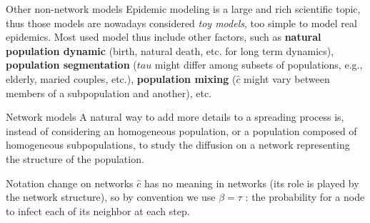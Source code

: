 \documentclass[a4paper,11pt]{book}
\begin{document}







\begin{textbox}{Other non-network models}
Epidemic modeling is a large and rich scientific topic, thus those models are nowadays considered \textit{toy models}, too simple to model real epidemics. Most used model thus include other factors, such as \textbf{natural population dynamic} (birth, natural death, etc. for long term dynamics), \textbf{population segmentation} ($tau$ might differ among subsets of populations, e.g., elderly, maried couples, etc.), \textbf{population mixing} ($\hat{c}$ might vary between members of a subpopulation and another), etc.
\end{textbox}

\begin{textbox}{Network models}
A natural way to add more details to a spreading process is, instead of considering an homogeneous population, or a population composed of homogeneous subpopulations, to study the diffusion on a network representing the structure of the population.


\end{textbox}



\begin{textbox}{Notation change on networks}
$\hat{c}$ has no meaning in networks (its role is played by the network structure), so by convention we use $\beta=\tau$ : the probability for a node to infect each of its neighbor at each step.

\end{textbox}
\end{document}
